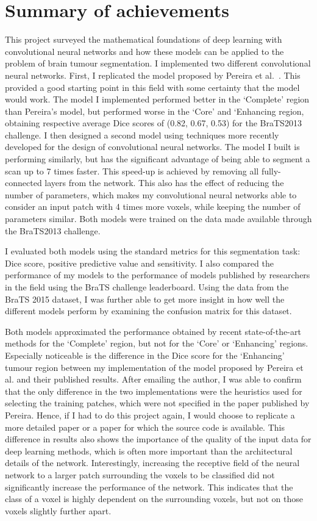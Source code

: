 \documentclass[12pt,a4paper,twoside,openright]{report}
\begin{document}
\section{Summary of achievements}
This project surveyed the mathematical foundations of deep learning with convolutional neural networks and how these models can be applied to the problem of brain tumour segmentation. I implemented two different convolutional neural networks. First, I replicated the model proposed by Pereira et al.\ \cite{pereira}. This provided a good starting point in this field with some certainty that the model would work. The model I implemented performed better in the `Complete' region than Pereira's model, but performed worse in the `Core' and `Enhancing region, obtaining respective average Dice scores of (0.82, 0.67, 0.53) for the BraTS2013 \cite{brats-proceedings} challenge. I then designed a second model using techniques more recently developed for the design of convolutional neural networks. The model I built is performing similarly, but has the significant advantage of being able to segment a scan up to 7 times faster. This speed-up is achieved by removing all fully-connected layers from the network. This also has the effect of reducing the number of parameters, which makes my convolutional neural networks able to consider an input patch with 4 times more voxels, while keeping the number of parameters similar. Both models were trained on the data made available through the BraTS2013 challenge.

I evaluated both models using the standard metrics for this segmentation task: Dice score, positive predictive value and sensitivity. I also compared the performance of my models to the performance of models published by researchers in the field using the BraTS challenge leaderboard. Using the data from the BraTS 2015 dataset, I was further able to get more insight in how well the different models perform by examining the confusion matrix for this dataset.

Both models approximated the performance obtained by recent state-of-the-art methods for the `Complete' region, but not for the `Core' or `Enhancing' regions. Especially noticeable is the difference in the Dice score for the `Enhancing' tumour region between my implementation of the model proposed  by Pereira et al. and their published results. After emailing the author, I was able to confirm that the only difference in the two implementations were the heuristics used for selecting the training patches, which were not specified in the paper published by Pereira. Hence, if I had to do this project again, I would choose to replicate a more detailed paper or a paper for which the source code is available. This difference in results also shows the importance of the quality of the input data for deep learning methods, which is often more important than the architectural details of the network. Interestingly, increasing the receptive field of the neural network to a larger patch surrounding the voxels to be classified did not significantly increase the performance of the network. This indicates that the class of a voxel is highly dependent on the surrounding voxels, but not on those voxels slightly further apart.
\end{document}
